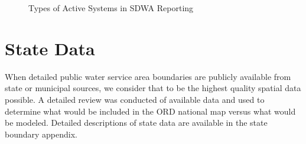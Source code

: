 \documentclass[
  letterpaper,
  DIV=11,
  numbers=noendperiod,
  oneside]{scrartcl}
\begin{document}
\begin{figure}


\caption{\label{fig-systemType}Types of Active Systems in SDWA
Reporting}

\end{figure}%

\section{State Data}\label{state-data}

When detailed public water service area boundaries are publicly
available from state or municipal sources, we consider that to be the
highest quality spatial data possible. A detailed review was conducted
of available data and used to determine what would be included in the
ORD national map versus what would be modeled. Detailed descriptions of
state data are available in the state boundary appendix.
\end{document}
